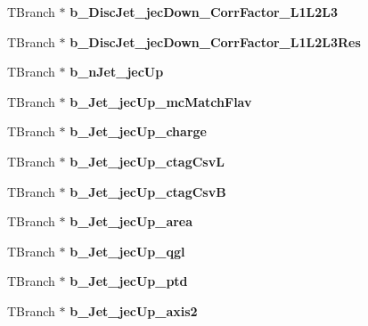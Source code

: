 \begin{DoxyCompactItemize}
T\+Branch $\ast$ {\bfseries b\+\_\+\+Disc\+Jet\+\_\+jec\+Down\+\_\+\+Corr\+Factor\+\_\+\+L1\+L2\+L3}
\item 
\hypertarget{classMiniTree_a6311500259c199e92e8e4a2e90044396}{}\label{classMiniTree_a6311500259c199e92e8e4a2e90044396} 
T\+Branch $\ast$ {\bfseries b\+\_\+\+Disc\+Jet\+\_\+jec\+Down\+\_\+\+Corr\+Factor\+\_\+\+L1\+L2\+L3\+Res}
\item 
\hypertarget{classMiniTree_a97d8680dc1de7d36978ef882e799ef63}{}\label{classMiniTree_a97d8680dc1de7d36978ef882e799ef63} 
T\+Branch $\ast$ {\bfseries b\+\_\+n\+Jet\+\_\+jec\+Up}
\item 
\hypertarget{classMiniTree_a31554b8f65002e66046cb6b9f2e44e64}{}\label{classMiniTree_a31554b8f65002e66046cb6b9f2e44e64} 
T\+Branch $\ast$ {\bfseries b\+\_\+\+Jet\+\_\+jec\+Up\+\_\+mc\+Match\+Flav}
\item 
\hypertarget{classMiniTree_ac4065c32dd1296ba21b3e01c40ced822}{}\label{classMiniTree_ac4065c32dd1296ba21b3e01c40ced822} 
T\+Branch $\ast$ {\bfseries b\+\_\+\+Jet\+\_\+jec\+Up\+\_\+charge}
\item 
\hypertarget{classMiniTree_afc425e844daa93d49cc6457bf9f3369b}{}\label{classMiniTree_afc425e844daa93d49cc6457bf9f3369b} 
T\+Branch $\ast$ {\bfseries b\+\_\+\+Jet\+\_\+jec\+Up\+\_\+ctag\+CsvL}
\item 
\hypertarget{classMiniTree_a4be5c9f88bba30c3db6f17e6cba91f7e}{}\label{classMiniTree_a4be5c9f88bba30c3db6f17e6cba91f7e} 
T\+Branch $\ast$ {\bfseries b\+\_\+\+Jet\+\_\+jec\+Up\+\_\+ctag\+CsvB}
\item 
\hypertarget{classMiniTree_a3be48a859437d42c8fe4752b2e3b718a}{}\label{classMiniTree_a3be48a859437d42c8fe4752b2e3b718a} 
T\+Branch $\ast$ {\bfseries b\+\_\+\+Jet\+\_\+jec\+Up\+\_\+area}
\item 
\hypertarget{classMiniTree_ad3da7d9294748d18a85be8ac3e43f717}{}\label{classMiniTree_ad3da7d9294748d18a85be8ac3e43f717} 
T\+Branch $\ast$ {\bfseries b\+\_\+\+Jet\+\_\+jec\+Up\+\_\+qgl}
\item 
\hypertarget{classMiniTree_abae84c5685dacd70b07f75e9cd6dc1eb}{}\label{classMiniTree_abae84c5685dacd70b07f75e9cd6dc1eb} 
T\+Branch $\ast$ {\bfseries b\+\_\+\+Jet\+\_\+jec\+Up\+\_\+ptd}
\item 
\hypertarget{classMiniTree_ae84beed531c821ef680912f92003d0a1}{}\label{classMiniTree_ae84beed531c821ef680912f92003d0a1} 
T\+Branch $\ast$ {\bfseries b\+\_\+\+Jet\+\_\+jec\+Up\+\_\+axis2}
\item 
\hypertarget{classMiniTree_a53d1b030186a7bb990c3e78f5ec4baa5}{}\label{classMiniTree_a53d1b030186a7bb990c3e78f5ec4baa5} 

\end{DoxyCompactItemize}
